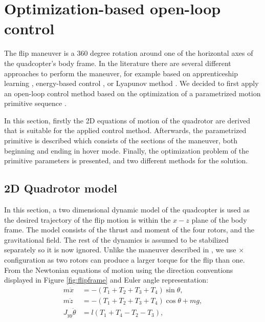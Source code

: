 \section{Optimization-based open-loop control}\label{sec:flip}
The flip maneuver is a 360 degree rotation around one of the horizontal axes of the quadcopter's body frame. In the literature there are several different approaches to perform the maneuver, for example based on apprenticeship learning \cite{abbeel2010}, energy-based control \cite{energy-quaternion}, or Lyapunov method \cite{lyapunov-flip}. We decided to first apply an  open-loop control method based on the optimization of a parametrized motion primitive sequence \cite{LSICRA2010}.

In this section, firstly the 2D equations of motion of the quadrotor are derived that is suitable for the applied control method. Afterwards, the parametrized primitive is described which consists of the sections of the maneuver, both beginning and ending in hover mode. Finally, the optimization problem of the primitive parameters is presented, and two different methods for the solution. 

\subsection{2D Quadrotor model}

In this section, a two dimensional dynamic model of the quadcopter is used as the desired trajectory of the flip motion is within the $x-z$ plane of the body frame. The model consists of the thrust and moment of the four rotors, and the gravitational field. The rest of the dynamics is assumed to be stabilized separately so it is now ignored. Unlike the maneuver described in \cite{LSICRA2010}, we use $\times$ configuration as two rotors can produce a larger torque for the flip than one. From the Newtonian equations of motion using the direction conventions displayed in Figure \ref{fig:flipframe} and Euler angle representation:
\begin{align}
m\ddot{x}&=-(T_1 + T_2 + T_3 + T_4)\sin\theta,\\
m\ddot{z}&=-(T_1 + T_2 +T_3 + T_4) \cos\theta+mg,\\
J_{yy}\ddot{\theta} &= l(T_1+T_4-T_2-T_3),\label{eq:opinp1}
\end{align}

